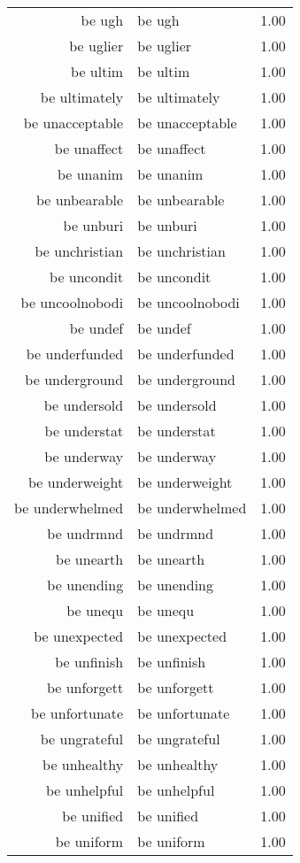 \begin{table}[ht]
\begin{tabular}{rlr}
  be ugh & be ugh & 1.00 \\ 
  be uglier & be uglier & 1.00 \\ 
  be ultim & be ultim & 1.00 \\ 
  be ultimately & be ultimately & 1.00 \\ 
  be unacceptable & be unacceptable & 1.00 \\ 
  be unaffect & be unaffect & 1.00 \\ 
  be unanim & be unanim & 1.00 \\ 
  be unbearable & be unbearable & 1.00 \\ 
  be unburi & be unburi & 1.00 \\ 
  be unchristian & be unchristian & 1.00 \\ 
  be uncondit & be uncondit & 1.00 \\ 
  be uncoolnobodi & be uncoolnobodi & 1.00 \\ 
  be undef & be undef & 1.00 \\ 
  be underfunded & be underfunded & 1.00 \\ 
  be underground & be underground & 1.00 \\ 
  be undersold & be undersold & 1.00 \\ 
  be understat & be understat & 1.00 \\ 
  be underway & be underway & 1.00 \\ 
  be underweight & be underweight & 1.00 \\ 
  be underwhelmed & be underwhelmed & 1.00 \\ 
  be undrmnd & be undrmnd & 1.00 \\ 
  be unearth & be unearth & 1.00 \\ 
  be unending & be unending & 1.00 \\ 
  be unequ & be unequ & 1.00 \\ 
  be unexpected & be unexpected & 1.00 \\ 
  be unfinish & be unfinish & 1.00 \\ 
  be unforgett & be unforgett & 1.00 \\ 
  be unfortunate & be unfortunate & 1.00 \\ 
  be ungrateful & be ungrateful & 1.00 \\ 
  be unhealthy & be unhealthy & 1.00 \\ 
  be unhelpful & be unhelpful & 1.00 \\ 
  be unified & be unified & 1.00 \\ 
  be uniform & be uniform & 1.00 \\ 

\end{tabular}
\end{table}
